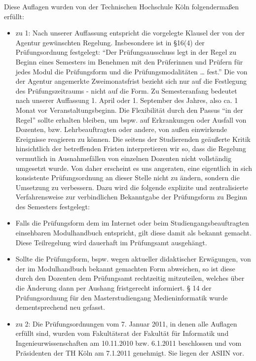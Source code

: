 Diese Auflagen wurden von der Technischen Hochschule Köln folgendermaßen
erfüllt:

\begin{itemize}
\tightlist
\item
  zu 1: Nach unserer Auffassung entspricht die vorgelegte Klausel der
  von der Agentur gewünschten Regelung. Insbesondere ist in §16(4) der
  Prüfungsordnung festgelegt: ``Der Prüfungsausschuss legt in der Regel
  zu Beginn eines Semesters im Benehmen mit den Prüferinnen und Prüfern
  für jedes Modul die Prüfungsform und die Prüfungsmodalitäten \ldots{}
  fest.'' Die von der Agentur angemerkte Zweimonatsfrist bezieht sich
  nur auf die Festlegung des Prüfungszeitraums - nicht auf die Form. Zu
  Semesteranfang bedeutet nach unserer Auffassung 1. April oder 1.
  September des Jahres, also ca. 1 Monat vor Veranstaltungsbeginn. Die
  Flexibilität durch den Passus ``in der Regel'' sollte erhalten
  bleiben, um bspw. auf Erkrankungen oder Ausfall von Dozenten, bzw.
  Lehrbeauftragten oder andere, von außen einwirkende Ereignisse
  reagieren zu können. Die seitens der Studierenden geäußerte Kritik
  hinsichtlich der betreffenden Fristen interpretieren wir so, dass die
  Regelung vermutlich in Ausnahmefällen von einzelnen Dozenten nicht
  vollständig umgesetzt wurde. Von daher erscheint es uns angeraten,
  eine eigentlich in sich konsistente Prüfungsordnung an dieser Stelle
  nicht zu ändern, sondern die Umsetzung zu verbessern. Dazu wird die
  folgende explizite und zentralisierte Verfahrensweise zur
  verbindlichen Bekanntgabe der Prüfungsform zu Beginn des Semesters
  festgelegt:
\item
  Falls die Prüfungsform dem im Internet oder beim
  Studiengangsbeauftragten einsehbaren Modulhandbuch entspricht, gilt
  diese damit als bekannt gemacht. Diese Teilregelung wird dauerhaft im
  Prüfungsamt ausgehängt.
\item
  Sollte die Prüfungsform, bspw. wegen aktueller didaktischer
  Erwägungen, von der im Modulhandbuch bekannt gemachten Form abweichen,
  so ist diese durch den Dozenten dem Prüfungsamt rechtzeitig
  mitzuteilen, welches über die Änderung dann per Aushang fristgerecht
  informiert. § 14 der Prüfungsordnung für den Masterstudiengang
  Medieninformatik wurde dementsprechend neu gefasst.
\item
  zu 2: Die Prüfungsordnungen vom 7. Januar 2011, in denen alle Auflagen
  erfüllt sind, wurden vom Fakultätsrat der Fakultät für Informatik und
  Ingenieurwissenschaften am 10.11.2010 bzw. 6.1.2011 beschlossen und
  vom Präsidenten der TH Köln am 7.1.2011 genehmigt. Sie liegen der
  ASIIN vor.
\end{itemize}

